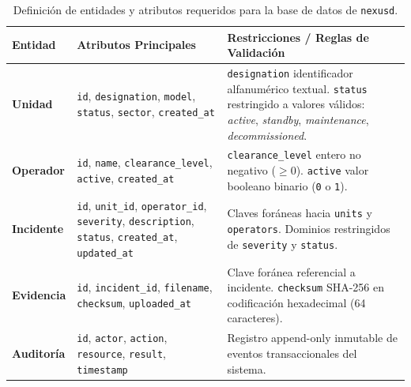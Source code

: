 \documentclass[10pt,a4paper]{article}
\begin{document}
\begin{table}[H]
    \centering
    \footnotesize
    \caption{Definición de entidades y atributos requeridos para la base de datos de \texttt{nexusd}.}
    \label{tab:entidades_sqlite}
    \begin{tabularx}{\textwidth}{p{1.7cm} >{\raggedright\arraybackslash}p{3.8cm} X}
        \toprule
        \rowcolor{tableheader}
        \textbf{Entidad} & \textbf{Atributos Principales} & \textbf{Restricciones / Reglas de Validación} \\
        \midrule
        \textbf{Unidad} & \texttt{id}, \texttt{designation}, \texttt{model}, \texttt{status}, \texttt{sector}, \texttt{created\_at} & \texttt{designation} identificador alfanumérico textual. \texttt{status} restringido a valores válidos: \textit{active}, \textit{standby}, \textit{maintenance}, \textit{decommissioned}. \\
        \rowcolor{rowalt}
        \textbf{Operador} & \texttt{id}, \texttt{name}, \texttt{clearance\_level}, \texttt{active}, \texttt{created\_at} & \texttt{clearance\_level} entero no negativo ($\ge 0$). \texttt{active} valor booleano binario (\texttt{0} o \texttt{1}). \\
        \textbf{Incidente} & \texttt{id}, \texttt{unit\_id}, \texttt{operator\_id}, \texttt{severity}, \texttt{description}, \texttt{status}, \texttt{created\_at}, \texttt{updated\_at} & Claves foráneas hacia \texttt{units} y \texttt{operators}. Dominios restringidos de \texttt{severity} y \texttt{status}. \\
        \rowcolor{rowalt}
        \textbf{Evidencia} & \texttt{id}, \texttt{incident\_id}, \texttt{filename}, \texttt{checksum}, \texttt{uploaded\_at} & Clave foránea referencial a incidente. \texttt{checksum} SHA-256 en codificación hexadecimal (64 caracteres). \\
        \textbf{Auditoría} & \texttt{id}, \texttt{actor}, \texttt{action}, \texttt{resource}, \texttt{result}, \texttt{timestamp} & Registro append-only inmutable de eventos transaccionales del sistema. \\
        \bottomrule
    \end{tabularx}
\end{table}
\end{document}
